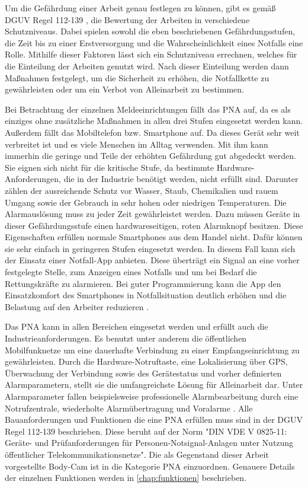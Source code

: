 \documentclass[thesis.tex]{subfiles}
\begin{document}
Um die Gefährdung einer Arbeit genau festlegen zu können, gibt es gemäß DGUV Regel 112-139 \cite[]{Regel_112-139}, die Bewertung der Arbeiten in verschiedene Schutzniveaus.
Dabei spielen sowohl die eben beschriebenen Gefährdungsstufen, die Zeit bis zu einer Erstversorgung und die Wahrscheinlichkeit eines Notfalls eine Rolle.
Mithilfe dieser Faktoren lässt sich ein Schutzniveau errechnen, welches für die Einteilung der Arbeiten genutzt wird.
Nach dieser Einteilung werden dann Maßnahmen festgelegt, um die Sicherheit zu erhöhen, die Notfallkette zu gewährleisten oder um ein Verbot von Alleinarbeit zu bestimmen.

Bei Betrachtung der einzelnen Meldeeinrichtungen fällt das PNA auf, da es als einziges ohne zusätzliche Maßnahmen in allen drei Stufen eingesetzt werden kann.
Außerdem fällt das Mobiltelefon bzw. Smartphone auf.
Da dieses Gerät sehr weit verbreitet ist und es viele Menschen im Alltag verwenden.
Mit ihm kann immerhin die geringe und Teile der erhöhten Gefährdung gut abgedeckt werden.
Sie eignen sich nicht für die kritische Stufe, da bestimmte Hardware-Anforderungen, die in der Industrie benötigt werden, nicht erfüllt sind.
Darunter zählen der ausreichende Schutz vor Wasser, Staub, Chemikalien und rauem Umgang sowie der Gebrauch in sehr hohen oder niedrigen Temperaturen.
Die Alarmauslösung muss zu jeder Zeit gewährleistet werden.
Dazu müssen Geräte in dieser Gefährdungsstufe einen hardwareseitigen, roten Alarmknopf besitzen.
Diese Eigenschaften erfüllen normale Smartphones aus dem Handel nicht.
Dafür können sie sehr einfach in geringeren Stufen eingesetzt werden.
In diesem Fall kann sich der Einsatz einer Notfall-App anbieten.
Diese überträgt ein Signal an eine vorher festgelegte Stelle, zum Anzeigen eines Notfalls und um bei Bedarf die Rettungskräfte zu alarmieren.
Bei guter Programmierung kann die App den Einsatzkomfort des Smartphones in Notfallsituation deutlich erhöhen und die Belastung auf den Arbeiter reduzieren \cite[vgl. S.2-5]{FAQ-PNAuAPP}.

Das PNA kann in allen Bereichen eingesetzt werden und erfüllt auch die Industrieanforderungen.
Es benutzt unter anderem die öffentlichen Mobilfunknetze um eine dauerhafte Verbindung zu einer Empfangseinrichtung zu gewährleisten.
Durch die Hardware-Notruftaste, eine Lokalisierung über GPS, Überwachung der Verbindung sowie des Gerätestatus und vorher definierten Alarmparametern, stellt sie die umfangreichste Lösung für Alleinarbeit dar.
Unter Alarmparameter fallen beispielsweise professionelle Alarmbearbeitung durch eine Notrufzentrale, wiederholte Alarmübertragung und Voralarme \cite[vgl. S.2-5]{FAQ-PNAuAPP}.
Alle Bauanforderungen und Funktionen die eine PNA erfüllen muss sind in der DGUV Regel 112-139 \cite[]{Regel_112-139} beschrieben.
Diese beruht auf der Norm "DIN VDE V 0825-11: Geräte- und Prüfanforderungen für Personen-Notsignal-Anlagen unter Nutzung öffentlicher Telekommunikationsnetze".
Die als Gegenstand dieser Arbeit vorgestellte Body-Cam ist in die Kategorie PNA einzuordnen.
Genauere Details der einzelnen Funktionen werden in \autoref{chap:funktionen} beschrieben.
\end{document}
